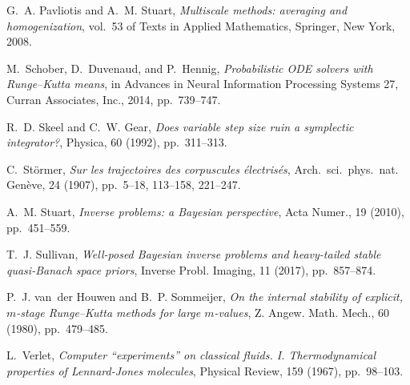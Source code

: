 \documentclass[10pt]{article}
\begin{document}
\begin{thebibliography}{10}
	{\sc G.~A. Pavliotis and A.~M. Stuart}, {\em Multiscale methods: averaging and
		homogenization}, vol.~53 of Texts in Applied Mathematics, Springer, New York,
	2008.
	
	{\sc M.~Schober, D.~Duvenaud, and P.~Hennig}, {\em Probabilistic {ODE} solvers
		with {R}unge--{K}utta means}, in Advances in Neural Information Processing
	Systems 27, Curran Associates, Inc., 2014, pp.~739--747.
	
	{\sc R.~D. Skeel and C.~W. Gear}, {\em Does variable step size ruin a
		symplectic integrator?}, Physica, 60 (1992), pp.~311--313.
	
	{\sc C.~St\"ormer}, {\em Sur les trajectoires des corpuscules \'electris\'es},
	Arch.\ sci.\ phys.\ nat. Gen\`eve, 24 (1907), pp.~5--18, 113--158, 221--247.
	
	{\sc A.~M. Stuart}, {\em Inverse problems: a {B}ayesian perspective}, Acta
	Numer., 19 (2010), pp.~451--559.
	
	{\sc T.~J. Sullivan}, {\em Well-posed {B}ayesian inverse problems and
		heavy-tailed stable quasi-{B}anach space priors}, Inverse Probl. Imaging, 11
	(2017), pp.~857--874.
	
	{\sc P.~J. van~der Houwen and B.~P. Sommeijer}, {\em On the internal stability
		of explicit, {$m$}-stage {R}unge--{K}utta methods for large {$m$}-values}, Z.
	Angew. Math. Mech., 60 (1980), pp.~479--485.
	
	{\sc L.~Verlet}, {\em Computer ``experiments'' on classical fluids. {I}.
		{T}hermodynamical properties of {L}ennard-{J}ones molecules}, Physical
	Review, 159 (1967), pp.~98--103.
	
\end{thebibliography}
\end{document}
